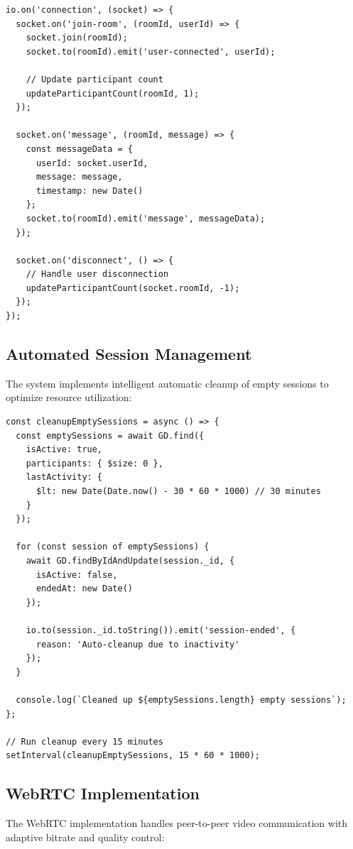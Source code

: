 \documentclass[conference]{IEEEtran}
\begin{document}
\begin{lstlisting}[caption=Socket.IO Event Handling, label=lst:socket]
io.on('connection', (socket) => {
  socket.on('join-room', (roomId, userId) => {
    socket.join(roomId);
    socket.to(roomId).emit('user-connected', userId);
    
    // Update participant count
    updateParticipantCount(roomId, 1);
  });
  
  socket.on('message', (roomId, message) => {
    const messageData = {
      userId: socket.userId,
      message: message,
      timestamp: new Date()
    };
    socket.to(roomId).emit('message', messageData);
  });
  
  socket.on('disconnect', () => {
    // Handle user disconnection
    updateParticipantCount(socket.roomId, -1);
  });
});
\end{lstlisting}

\subsection{Automated Session Management}

The system implements intelligent automatic cleanup of empty sessions to optimize resource utilization:

\begin{lstlisting}[caption=Auto-cleanup Mechanism, label=lst:cleanup]
const cleanupEmptySessions = async () => {
  const emptySessions = await GD.find({
    isActive: true,
    participants: { $size: 0 },
    lastActivity: { 
      $lt: new Date(Date.now() - 30 * 60 * 1000) // 30 minutes
    }
  });
  
  for (const session of emptySessions) {
    await GD.findByIdAndUpdate(session._id, { 
      isActive: false,
      endedAt: new Date()
    });
    
    io.to(session._id.toString()).emit('session-ended', {
      reason: 'Auto-cleanup due to inactivity'
    });
  }
  
  console.log(`Cleaned up ${emptySessions.length} empty sessions`);
};

// Run cleanup every 15 minutes
setInterval(cleanupEmptySessions, 15 * 60 * 1000);
\end{lstlisting}

\subsection{WebRTC Implementation}

The WebRTC implementation handles peer-to-peer video communication with adaptive bitrate and quality control:
\end{document}
